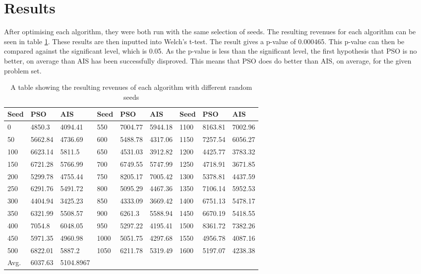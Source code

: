 \documentclass{article}
\begin{document}
\section{Results}

After optimising each algorithm, they were both run with the same selection of seeds. The resulting revenues for each algorithm can be seen in table \ref{Seed-Results}. These results are then inputted into Welch’s t-test. The result gives a p-value of 0.000465. This p-value can then be compared against the significant level, which is 0.05. As the p-value is less than the significant level, the first hypothesis that PSO is no better, on average than AIS has been successfully disproved. This means that PSO does do better than AIS, on average, for the given problem set.

\begin{table}[H]
\centering
\begin{tabular}{@{}lllllllll@{}}
\toprule
Seed & PSO & AIS & Seed & PSO & AIS & Seed & PSO & AIS\\ \midrule
0	&	4850.3	&	4094.41	&	550	&	7004.77	&	5944.18	&	1100	&	8163.81	&	7002.96\\
50	&	5662.84	&	4736.69	&	600	&	5488.78	&	4317.06	&	1150	&	7257.54	&	6056.27\\
100	&	6623.14	&	5811.5	&	650	&	4531.03	&	3912.82	&	1200	&	4425.77	&	3783.32\\
150	&	6721.28	&	5766.99	&	700	&	6749.55	&	5747.99	&	1250	&	4718.91	&	3671.85\\
200	&	5299.78	&	4755.44	&	750	&	8205.17	&	7005.42	&	1300	&	5378.81	&	4437.59\\
250	&	6291.76	&	5491.72	&	800	&	5095.29	&	4467.36	&	1350	&	7106.14	&	5952.53\\
300	&	4404.94	&	3425.23	&	850	&	4333.09	&	3669.42	&	1400	&	6751.13	&	5478.17\\
350	&	6321.99	&	5508.57	&	900	&	6261.3	&	5588.94	&	1450	&	6670.19	&	5418.55\\
400	&	7054.8	&	6048.05	&	950	&	5297.22	&	4195.41	&	1500	&	8361.72	&	7382.26\\
450	&	5971.35	&	4960.98	&	1000	&	5051.75	&	4297.68	&	1550	&	4956.78	&	4087.16\\
500	&	6822.01	&	5887.2	&	1050	&	6211.78	&	5319.49	&	1600	&	5197.07	&	4238.38\\					
Avg.&6037.63&5104.8967\\\midrule
\end{tabular}
\caption{A table showing the resulting revenues of each algorithm with different random seeds}
\label{Seed-Results}
\end{table}
\end{document}
